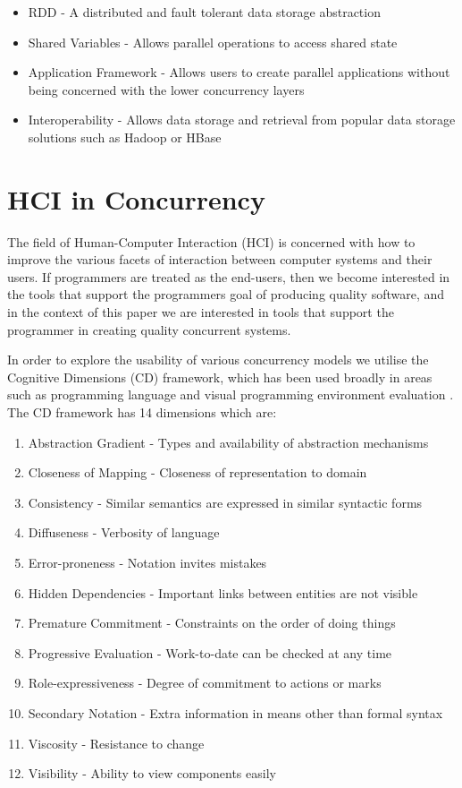 \documentclass{sig-alternate}
\begin{document}
\begin{itemize}
\item RDD - A distributed and fault tolerant data storage abstraction
\item Shared Variables - Allows parallel operations to access shared state
\item Application Framework - Allows users to create parallel applications without being concerned with the lower concurrency layers
\item Interoperability - Allows data storage and retrieval from popular data storage solutions such as Hadoop or HBase
\end{itemize}

\section{HCI in Concurrency}
The field of Human-Computer Interaction (HCI) is concerned with how to improve the various facets of interaction between computer systems and their users. If programmers are treated as the end-users, then we become interested in the tools that support the programmers goal of producing quality \cite{9126} software, and in the context of this paper we are interested in tools that support the programmer in creating quality concurrent systems.

In order to explore the usability of various concurrency models we utilise the Cognitive Dimensions \cite{green89:_cognit_dimen_notat} (CD) framework, which has been used broadly in areas such as programming language \cite{enpl} and visual programming environment evaluation \cite{cdf}. The CD framework has 14 dimensions which are:

\begin{enumerate}
\item Abstraction Gradient - Types and availability of abstraction mechanisms
\item Closeness of Mapping - Closeness of representation to domain
\item Consistency - Similar semantics are expressed in similar syntactic forms
\item Diffuseness - Verbosity of language
\item Error-proneness - Notation invites mistakes
\item Hidden Dependencies - Important links between entities are not visible
\item Premature Commitment - Constraints on the order of doing things
\item Progressive Evaluation - Work-to-date can be checked at any time
\item Role-expressiveness - Degree of commitment to actions or marks
\item Secondary Notation - Extra information in means other than formal syntax
\item Viscosity - Resistance to change
\item Visibility - Ability to view components easily
\end{enumerate}
\end{document}
